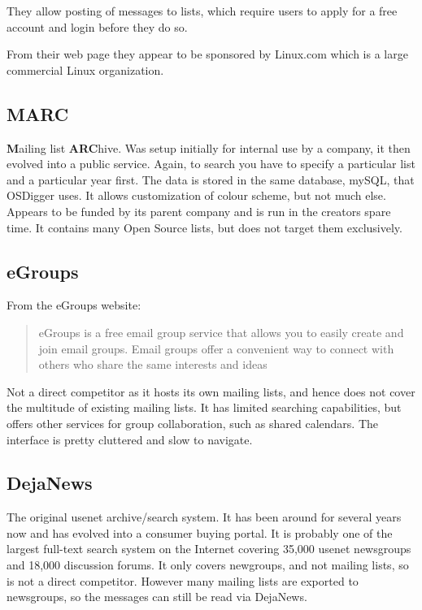 They allow posting of messages to lists, which require users to apply for a free account and login before they do so.

From their web page they appear to be sponsored by Linux.com which is a large commercial Linux organization.

\subsection{MARC}
\textbf{M}ailing list \textbf{ARC}hive.  Was setup initially for internal use by a company, it then evolved into a public service.  Again, to search you have to specify a particular list and a particular year first.  The data is stored in the same database, mySQL, that OSDigger uses.  It allows customization of colour scheme, but not much else.  Appears to be funded by its parent company and is run in the creators spare time.  It contains many Open Source lists, but does not target them exclusively.

\subsection{eGroups}
From the eGroups website:
\begin{quote}
  eGroups is a free email group service that allows you to easily
  create and join email groups. Email groups offer a convenient way to
  connect with others who share the same interests and ideas
\end{quote}
Not a direct competitor as it hosts its own mailing lists, and hence does not cover the multitude of existing mailing lists.  It has limited searching capabilities, but offers other services for group collaboration, such as shared calendars.  The interface is pretty cluttered and slow to navigate.


\subsection{DejaNews}
The original usenet archive/search system.  It has been around for several years now and has evolved into a consumer buying portal.  It is probably one of the largest full-text search system on the Internet covering 35,000 usenet newsgroups and 18,000 discussion forums.  It only covers newgroups, and not mailing lists, so is not a direct competitor.  However many mailing lists are exported to newsgroups, so the messages can still be read via DejaNews.

